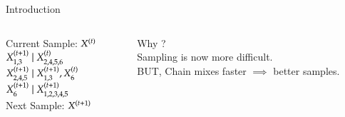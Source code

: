 \documentclass[serif,mathserif,final]{beamer}
\newcommand{\itemlinespace}{0.3in}
\begin{document}
\begin{frame}{}
\begin{columns}[t]
\begin{column}{0.49\linewidth}
\begin{block}{\Huge Introduction}
{\begin{columns}
        \begin{column}{5in}
            Current Sample: $X^{(t)}$\\
            \vspace{\itemlinespace}
            $X^{(t+1)}_{1,3} \;|\; X^{(t)}_{2, 4, 5, 6}$\\
            \vspace{\itemlinespace}
            $X^{(t+1)}_{2,4,5} \;|\; X^{(t+1)}_{1,3}, X^{(t)}_{6}$\\
            \vspace{\itemlinespace}
            $X^{(t+1)}_6 \;|\; X^{(t+1)}_{1, 2, 3, 4, 5}$\\
            \vspace{\itemlinespace}
            Next Sample: $X^{(t+1)}$\\
        \end{column}

        \begin{column}{5in}
            Why ?\\
            \vspace{\itemlinespace}
            Sampling is now more difficult. \\
            \vspace{\itemlinespace}
            BUT, Chain mixes faster $\implies$ better samples.
        \end{column}
        \end{columns}

}
\end{block}
\end{column}
\end{columns}
\end{frame}
\end{document}
